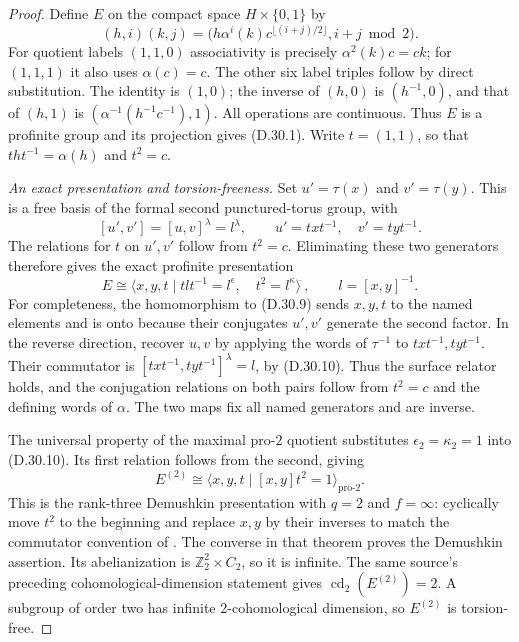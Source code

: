 \begin{proof}
Define $E$ on the compact space $H\times\{0,1\}$ by
\[
 (h,i)(k,j)=
 \bigl(h\alpha^i(k)c^{\lfloor(i+j)/2\rfloor},
                           i+j\bmod2\bigr).            \tag{D.30.9}
\]
For quotient labels $(1,1,0)$ associativity is precisely
$\alpha^2(k)c=ck$; for $(1,1,1)$ it also uses
$\alpha(c)=c$.  The other six label triples follow by direct
substitution.  The identity is $(1,0)$; the inverse of $(h,0)$ is
$(h^{-1},0)$, and that of $(h,1)$ is
$(\alpha^{-1}(h^{-1}c^{-1}),1)$.
All operations are continuous.  Thus $E$ is a profinite group
and its projection gives (D.30.1).  Write $t=(1,1)$, so that
$tht^{-1}=\alpha(h)$ and $t^2=c$.

\emph{An exact presentation and torsion-freeness.}
Set $u'=\tau(x)$ and $v'=\tau(y)$.  This is a free basis
of the formal second punctured-torus group, with
\[
 [u',v']=[u,v]^\lambda=l^\lambda,\qquad
       u'=txt^{-1},\quad v'=tyt^{-1}.
\]
The relations for $t$ on $u',v'$ follow from $t^2=c$.
Eliminating these two generators therefore gives the exact
profinite presentation
\[
 E\cong\langle x,y,t\mid
          tlt^{-1}=l^\epsilon,\quad t^2=l^\kappa
                 \rangle^{\widehat{\ }},
                 \qquad l=[x,y]^{-1}.                 \tag{D.30.10}
\]
For completeness, the homomorphism to (D.30.9) sends $x,y,t$
to the named elements and is onto because their conjugates
$u',v'$ generate the second factor.  In the reverse direction,
recover $u,v$ by applying the words of $\tau^{-1}$ to
$txt^{-1},tyt^{-1}$.  Their commutator is
$[txt^{-1},tyt^{-1}]^\lambda=l$, by (D.30.10).
Thus the surface relator holds, and the conjugation relations on
both pairs follow from $t^2=c$ and the defining words of
$\alpha$.  The two maps fix all named generators and are inverse.

The universal property of the maximal pro-$2$ quotient substitutes
$\epsilon_2=\kappa_2=1$ into (D.30.10).  Its first relation follows
from the second, giving
\[
 E^{(2)}\cong
       \langle x,y,t\mid[x,y]t^2=1\rangle_{\mathrm{pro}\text{-}2}.
                                                        \tag{D.30.11}
\]
This is the rank-three Demushkin presentation with $q=2$ and
$f=\infty$: cyclically move $t^2$ to the beginning and replace
$x,y$ by their inverses to match the commutator convention of
\cite[\S1.4 and Theorem~1.9]{R-Wilkes}.  The converse in that
theorem proves the Demushkin assertion.  Its abelianization is
$\mathbb Z_2^2\times C_2$, so it is infinite.  The same source's
preceding cohomological-dimension statement gives
$\operatorname{cd}_2(E^{(2)})=2$.  A subgroup of order two has
infinite $2$-cohomological dimension, so $E^{(2)}$ is torsion-free.


\end{proof}

